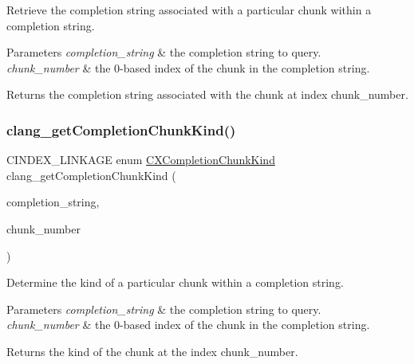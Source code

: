 Retrieve the completion string associated with a particular chunk within a completion string. 


\begin{DoxyParams}{Parameters}
{\em completion\+\_\+string} & the completion string to query.\\
\hline
{\em chunk\+\_\+number} & the 0-\/based index of the chunk in the completion string.\\
\hline
\end{DoxyParams}
\begin{DoxyReturn}{Returns}
the completion string associated with the chunk at index {\ttfamily chunk\+\_\+number}. 
\end{DoxyReturn}
\mbox{\label{group__CINDEX__CODE__COMPLET_gac61e18c6d895d85f1476c6091d486091}} 
\subsubsection{\texorpdfstring{clang\+\_\+get\+Completion\+Chunk\+Kind()}{clang\_getCompletionChunkKind()}}
{\footnotesize\ttfamily C\+I\+N\+D\+E\+X\+\_\+\+L\+I\+N\+K\+A\+GE enum \hyperlink{group__CINDEX__CODE__COMPLET_ga82570056548565efdd6fc74e57e75bbd}{C\+X\+Completion\+Chunk\+Kind} clang\+\_\+get\+Completion\+Chunk\+Kind (\begin{DoxyParamCaption}\item[{\hyperlink{group__CINDEX__CODE__COMPLET_gafea23a43a60ec3b4f3bedccfbb76883a}{C\+X\+Completion\+String}}]{completion\+\_\+string,  }\item[{unsigned}]{chunk\+\_\+number }\end{DoxyParamCaption})}



Determine the kind of a particular chunk within a completion string. 


\begin{DoxyParams}{Parameters}
{\em completion\+\_\+string} & the completion string to query.\\
\hline
{\em chunk\+\_\+number} & the 0-\/based index of the chunk in the completion string.\\
\hline
\end{DoxyParams}
\begin{DoxyReturn}{Returns}
the kind of the chunk at the index {\ttfamily chunk\+\_\+number}. 
\end{DoxyReturn}
\mbox{\label{group__CINDEX__CODE__COMPLET_ga98d4c869dda8fd4b5386f62d02d6ba0b}} 
